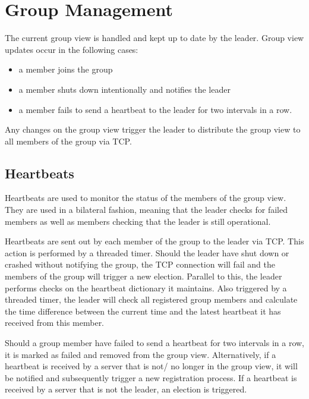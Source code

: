 \documentclass[runningheads]{llncs}
\begin{document}
\section{Group Management} \label{grpmngmnt}

The current group view is handled and kept up to date by the leader. Group view updates occur in the following cases:
\begin{itemize}
    \item a member joins the group
    \item a member shuts down intentionally and notifies the leader
    \item  a member fails to send a heartbeat to the leader for two intervals in a row.
\end{itemize}
Any changes on the group view trigger the leader to distribute the group view to all members of the group via TCP.

\subsection{Heartbeats} \label{heartbeats}

Heartbeats are used to monitor the status of the members of the group view. They are used in a bilateral fashion, meaning that the leader checks for failed members as well as members checking that the leader is still operational.

Heartbeats are sent out by each member of the group to the leader via TCP. This action is performed by a threaded timer. Should the leader have shut down or crashed without notifying the group, the TCP connection will fail and the members of the group will trigger a new election. Parallel to this, the leader performs checks on the heartbeat dictionary it maintains. Also triggered by a threaded timer, the leader will check all registered group members and calculate the time difference between the current time and the latest heartbeat it has received from this member.

Should a group member have failed to send a heartbeat for two intervals in a row, it is marked as failed and removed from the group view. Alternatively, if a heartbeat is received by a server that is not/ no longer in the group view, it will be notified and subsequently trigger a new registration process. If a heartbeat is received by a server that is not the leader, an election is triggered.
\end{document}
